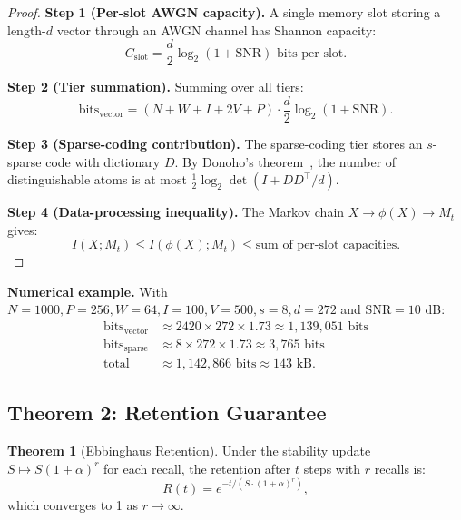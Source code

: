 \documentclass[12pt,a4paper]{article}
\theoremstyle{definition}
\newtheorem{theorem}{Theorem}[section]
\theoremstyle{remark}
\newcommand{\SNR}{\mathrm{SNR}}
\newcommand{\bits}{\mathrm{bits}}
\begin{document}
\begin{proof}
\textbf{Step 1 (Per-slot AWGN capacity).} A single memory slot storing a length-$d$ vector through an AWGN channel has Shannon capacity:
\begin{equation}
    C_{\mathrm{slot}} = \frac{d}{2} \log_2(1 + \SNR) \text{ bits per slot}.
\end{equation}

\textbf{Step 2 (Tier summation).} Summing over all tiers:
\begin{equation}
    \bits_{\mathrm{vector}} = (N + W + I + 2V + P) \cdot \frac{d}{2} \log_2(1 + \SNR).
\end{equation}

\textbf{Step 3 (Sparse-coding contribution).} The sparse-coding tier stores an $s$-sparse code with dictionary $D$. By Donoho's theorem~\cite{donoho2006}, the number of distinguishable atoms is at most $\frac{1}{2} \log_2 \det(I + D D^\top / d)$.

\textbf{Step 4 (Data-processing inequality).} The Markov chain $X \to \phi(X) \to M_t$ gives:
\begin{equation}
    I(X; M_t) \le I(\phi(X); M_t) \le \text{sum of per-slot capacities}.
\end{equation}
\end{proof}

\textbf{Numerical example.} With $N=1000, P=256, W=64, I=100, V=500, s=8, d=272$ and $\SNR = 10$ dB:
\begin{align}
    \bits_{\mathrm{vector}} &\approx 2420 \times 272 \times 1.73 \approx 1{,}139{,}051 \text{ bits} \\
    \bits_{\mathrm{sparse}} &\approx 8 \times 272 \times 1.73 \approx 3{,}765 \text{ bits} \\
    \text{total} &\approx 1{,}142{,}866 \text{ bits} \approx 143 \text{ kB}.
\end{align}

\subsection{Theorem 2: Retention Guarantee}

\begin{theorem}[Ebbinghaus Retention]
\label{thm:retention}
Under the stability update $S \mapsto S(1+\alpha)^r$ for each recall, the retention after $t$ steps with $r$ recalls is:
\begin{equation}
    R(t) = e^{-t / (S \cdot (1+\alpha)^r)},
\end{equation}
which converges to 1 as $r \to \infty$.
\end{theorem}
\end{document}
